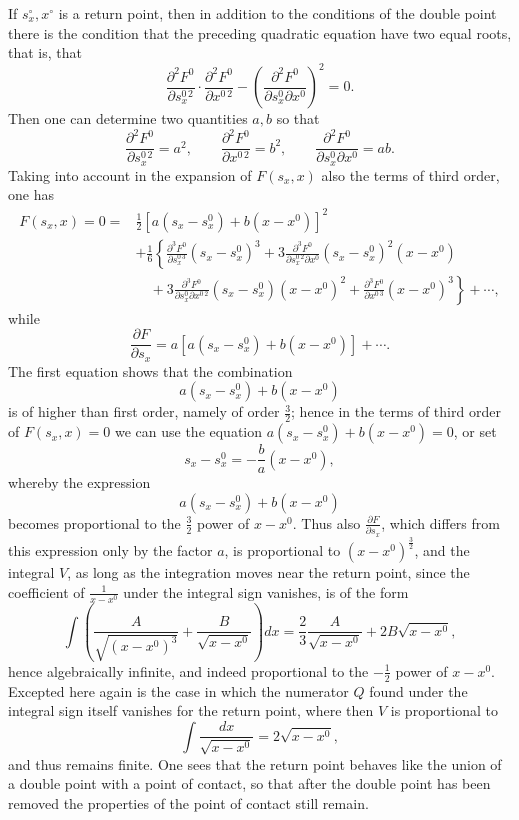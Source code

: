 \documentclass[10pt]{article}
\begin{document}
If $s_x^\circ,x^\circ$ is a return point, then in addition to the conditions of the double point there is the condition that the preceding quadratic equation have two equal roots, that is, that
\[
\frac{\partial^2F^0}{\partial s_x^{0\,2}}\cdot\frac{\partial^2F^0}{\partial x^{0\,2}}-
\left(\frac{\partial^2F^0}{\partial s_x^0\partial x^0}\right)^2=0.
\]
Then one can determine two quantities $a,b$ so that
\[
\frac{\partial^2F^0}{\partial s_x^{0\,2}}=a^2,
\qquad
\frac{\partial^2F^0}{\partial x^{0\,2}}=b^2,
\qquad
\frac{\partial^2F^0}{\partial s_x^0\partial x^0}=ab.
\]
Taking into account in the expansion of $F(s_x,x)$ also the terms of third order, one has
\[
\begin{aligned}
F(s_x,x)=0={}&\frac12\left[a(s_x-s_x^0)+b(x-x^0)\right]^2\\
&+\frac16\left\{\frac{\partial^3F^0}{\partial s_x^{0\,3}}(s_x-s_x^0)^3
+3\frac{\partial^3F^0}{\partial s_x^{0\,2}\partial x^0}(s_x-s_x^0)^2(x-x^0)\right.\\
&\left.\quad+3\frac{\partial^3F^0}{\partial s_x^0\partial x^{0\,2}}(s_x-s_x^0)(x-x^0)^2
+\frac{\partial^3F^0}{\partial x^{0\,3}}(x-x^0)^3\right\}+\cdots,
\end{aligned}
\]
while
\[
\frac{\partial F}{\partial s_x}=a\left[a(s_x-s_x^0)+b(x-x^0)\right]+\cdots.
\]
The first equation shows that the combination
\[
a(s_x-s_x^0)+b(x-x^0)
\]
is of higher than first order, namely of order $\frac32$; hence in the terms of third order of $F(s_x,x)=0$ we can use the equation $a(s_x-s_x^0)+b(x-x^0)=0$, or set
\[
s_x-s_x^0=-\frac{b}{a}(x-x^0),
\]
whereby the expression
\[
a(s_x-s_x^0)+b(x-x^0)
\]
becomes proportional to the $\frac32$ power of $x-x^0$. Thus also $\frac{\partial F}{\partial s_x}$, which differs from this expression only by the factor $a$, is proportional to $(x-x^0)^{\frac32}$, and the integral $V$, as long as the integration moves near the return point, since the coefficient of $\frac{1}{x-x^0}$ under the integral sign vanishes, is of the form
\[
\int\left(\frac{A}{\sqrt{(x-x^0)^3}}+\frac{B}{\sqrt{x-x^0}}\right)dx=
\frac{2}{3}\frac{A}{\sqrt{x-x^0}}+2B\sqrt{x-x^0},
\]
hence algebraically infinite, and indeed proportional to the $-\frac12$ power of $x-x^0$. Excepted here again is the case in which the numerator $Q$ found under the integral sign itself vanishes for the return point, where then $V$ is proportional to
\[
\int\frac{dx}{\sqrt{x-x^0}}=2\sqrt{x-x^0},
\]
and thus remains finite. One sees that the return point behaves like the union of a double point with a point of contact, so that after the double point has been removed the properties of the point of contact still remain.
\end{document}
